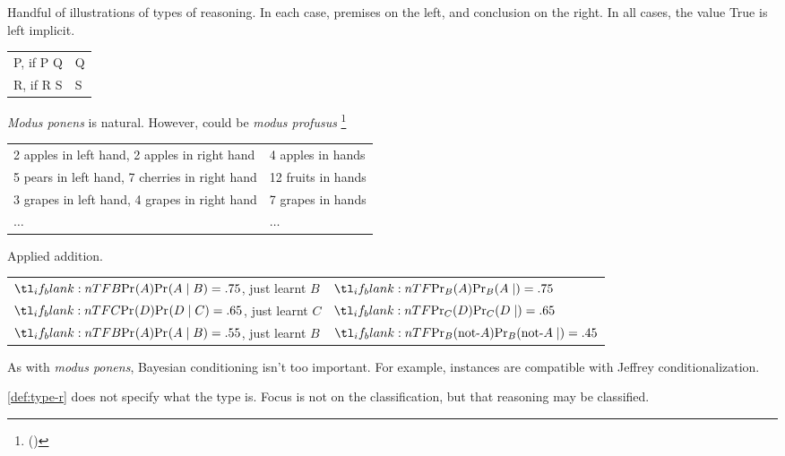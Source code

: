 \begin{note}
  Handful of illustrations of types of reasoning.
  In each case, premises on the left, and conclusion on the right.
  In all cases, the value True is left implicit.


  \begin{illustration}
    \begin{tabular}[h]{p{.55\linewidth}|p{.4\linewidth}}
      P, if P Q & Q \\
      R, if R S & S \\
    \end{tabular}
  \end{illustration}

  \emph{Modus ponens} is natural.
  However, could be \emph{modus profusus}%
  \footnote{
     (\cite[317]{Turri:2010aa})
    }


  \begin{illustration}
    \begin{tabular}[h]{p{.55\linewidth}|p{.4\linewidth}}
      2 apples in left hand, 2 apples in right hand & 4 apples in hands \\
      5 pears in left hand, 7 cherries in right hand & 12 fruits in hands \\
      3 grapes in left hand, 4 grapes in right hand & 7 grapes in hands \\
      \(\hdots\) & \(\hdots\)
    \end{tabular}
    Applied addition.
  \end{illustration}


  \begin{illustration}
    \begin{tabular}[h]{p{.55\linewidth}|p{.4\linewidth}}
      \(\pr[B]{A} = .75\), just learnt \(B\)  & \(\pr[][B]{A} = .75\) \\
      \(\pr[C]{D} = .65\), just learnt  \(C\) & \(\pr[][C]{D} = .65\) \\
      \(\pr[B]{A} = .55\), just learnt \(B\) & \(\pr[][B]{\text{not-}A} = .45\)
    \end{tabular}
  \end{illustration}

  As with \emph{modus ponens}, Bayesian conditioning isn't too important.
  For example, instances are compatible with Jeffrey conditionalization.
\end{note}

\begin{note}
  \autoref{def:type-r} does not specify what the type is.
  Focus is not on the classification, but that reasoning may be classified.
\end{note}

